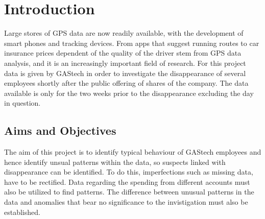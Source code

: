 \section{Introduction}
\label{sec:intro}





Large stores of GPS data are now readily available, with the development of smart phones and tracking devices. From apps that suggest running routes to car insurance prices dependent of the quality of the driver stem from GPS data analysis, and it is an increasingly important field of research.  For this project data is given by GAStech in order to investigate the disappearance of several employees shortly after the public offering of shares of the company. The data available is only for the two weeks prior to the disappearance excluding the day in question.

\subsection{Aims and Objectives}

The aim of this project is to identify typical behaviour of GAStech employees and hence identify unsual patterns within the data, so suspects linked with disappearance can be identified. To do this, imperfections such as missing data, have to be rectified. Data regarding the spending from different accounts must also be utilized to find patterns. The difference between unusual patterns in the data and anomalies that bear no significance to the invistigation must also be established. 